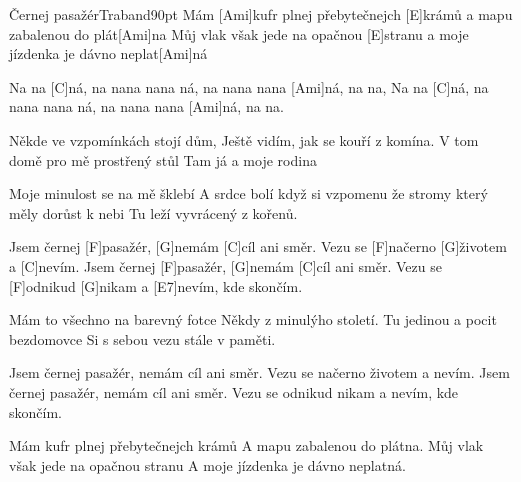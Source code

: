 \begin{song}{Černej pasažér}{Traband}{90pt}
%
Mám [Ami]kufr plnej přebytečnejch [E]krámů
a mapu zabalenou do plát[Ami]na
Můj vlak však jede na opačnou [E]stranu
a moje jízdenka je dávno neplat[Ami]ná

\verse{*}%
Na na [C]ná, na nana nana ná, na nana nana [Ami]ná, na na,
Na na [C]ná, na nana nana ná, na nana nana [Ami]ná, na na.

%
Někde ve vzpomínkách stojí dům,
Ještě vidím, jak se kouří z komína.
V tom domě pro mě prostřený stůl
Tam já a moje rodina

%
Moje minulost se na mě šklebí
A srdce bolí když si vzpomenu
že stromy který měly dorůst k nebi
Tu leží vyvrácený z kořenů.

\chorus%
Jsem černej [F]pasažér, [G]nemám [C]cíl ani směr.
Vezu se [F]načerno [G]{}životem a [C]nevím.
Jsem černej [F]pasažér, [G]nemám [C]cíl ani směr.
Vezu se [F]odnikud [G]nikam a [E7]nevím, kde skončím.

%
Mám to všechno na barevný fotce
Někdy z minulýho století.
Tu jedinou a pocit bezdomovce
Si s sebou vezu stále v paměti.

\chorus%
Jsem černej pasažér, nemám cíl ani směr.
Vezu se načerno životem a nevím.
Jsem černej pasažér, nemám cíl ani směr.
Vezu se odnikud nikam a nevím, kde skončím.

%
Mám kufr plnej přebytečnejch krámů
A mapu zabalenou do plátna.
Můj vlak však jede na opačnou stranu
A moje jízdenka je dávno neplatná.
\end{song}
